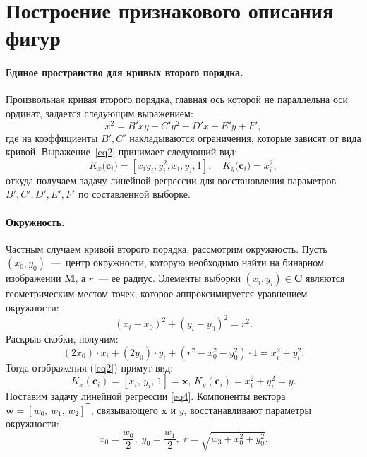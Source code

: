 \documentclass[12pt, twoside]{article}
\numberwithin{equation}{section}
\begin{document}
\section{Построение признакового описания фигур}
\paragraph{Единое пространство для кривых второго порядка.} Произвольная кривая второго порядка, главная ось которой не параллельна оси ординат, задается следующим выражением:
\[
\label{st:coef}
x^2 = B'xy+C'y^2+D'x+E'y+F',
\]
где на коэффициенты $B',C'$ накладываются ограничения, которые зависят от вида кривой. Выражение~\eqref{eq2} принимает следующий вид:
\[
\label{st:K_map}
K_x\bigr(\mathbf{c}_i\bigr)=\left[x_iy_i, y_i^2, x_i, y_i, 1\right], \quad K_y\bigr(\mathbf{c}_i\bigr)=x_i^2,
\]
откуда получаем задачу линейной регрессии для восстановления параметров~$B', C', D', E', F'$ по составленной выборке.

\paragraph{Окружность.} Частным случаем кривой второго порядка, рассмотрим окружность.
Пусть $(x_0, y_0)$~---~центр окружности, которую необходимо найти на бинарном изображении $\mathbf{M}$, а $r$~--- ее радиус.
Элементы выборки $(x_i, y_i) \in \mathbf{C}$ являются геометрическим местом точек, которое аппроксимируется уравнением окружности:
\begin{equation}
(x_i - x_0)^2 + (y_i - y_0)^2 = r^2.
\end{equation}
Раскрыв скобки, получим:
\begin{equation}(2x_0)\cdot x_i + (2y_0)\cdot y_i + (r^2 - x_0^2 - y_0^2)\cdot 1 = x_i^2 + y_i^2 . 
\end{equation}
Тогда отображения (\ref{eq2}) примут вид:
\begin{equation}
\label{10}
K_{x}(\mathbf{c}_i) = [x_i, \, y_i, \, 1] = \mathbf{x}, \,  K_{y}(\mathbf{c}_i) = x_i^2+y_i^2 = y.
\end{equation} 
Поставим задачу линейной регрессии \eqref{eq4}.
Компоненты вектора $\mathbf{w} = [w_0, \, w_1, \, w_2]^\mathsf{T}$, связывающего $\mathbf{x}$ и $y$, восстанавливают параметры окружности: \begin{equation} x_0 = \frac{w_0}{2}, \; y_0 = \frac{w_1}{2}, \; r = \sqrt{w_3 + x_0^2 + y_0 ^2}.\end{equation}
\end{document}
